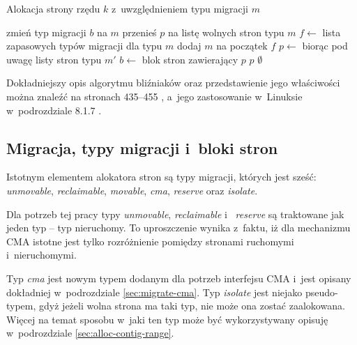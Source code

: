 \begin{algorithm}
\caption[Alokacja z~uwzględnieniem typu migracji.]{Alokacja strony
  rzędu $k$ z~uwzględnieniem typu migracji $m$}
\label{alg:buddy-fallback}
\begin{algorithmic}[1]
\State zmień typ migracji $b$ na $m$
    \State przenieś $p$ na listę wolnych stron typu $m$
\EndFor
\EndFunction
\Statex
{}
    \State $f \gets$ lista zapasowych typów migracji dla typu $m$
    \State dodaj $m$ na początek $f$
        \State $p \gets$  biorąc pod uwagę listy stron typu $m'$
                \State $b \gets$ blok stron zawierający $p$
                \State {}
            \EndIf
            \State \Return $p$
        \EndIf
    \EndFor
    \State \Return $\emptyset$
\EndFunction
\end{algorithmic}
\end{algorithm}
Dokładniejszy opis algorytmu bliźniaków oraz przedstawienie jego
właściwości można znaleźć na stronach 435--455
\autocite{bib:taocp-fa}, a~jego zastosowanie w~Linuksie w~podrozdziale
8.1.7 \autocite{bib:utlk}.


\subsection{Migracja, typy migracji i~bloki stron}\label{sec:migratetype}

Istotnym elementem alokatora stron są typy migracji, których jest
sześć: {\it unmovable}, {\it reclaimable}, {\it movable}, {\it cma},
{\it reserve} oraz {\it isolate}.

Dla potrzeb tej pracy typy {\it unmovable}, {\it reclaimable} i~{\it
  reserve} są traktowane jak jeden typ -- typ nieruchomy.  To
uproszczenie wynika z~faktu, iż dla mechanizmu CMA istotne jest tylko
rozróżnienie pomiędzy stronami ruchomymi i~nieruchomymi.

Typ {\it cma} jest nowym typem dodanym dla potrzeb interfejsu CMA
i~jest opisany dokładniej w~podrozdziale \ref{sec:migrate-cma}.  Typ
{\it isolate} jest niejako pseudo-typem, gdyż jeżeli wolna strona ma
taki typ, nie może ona zostać zaalokowana.  Więcej na temat sposobu
w~jaki ten typ może być wykorzystywany opisuję w~podrozdziale
\ref{sec:alloc-contig-range}.

